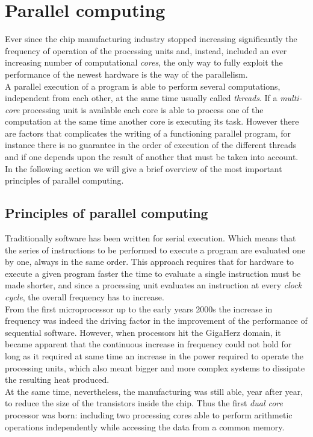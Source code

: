 \chapter{Parallel computing}\label{ch:gpu}
Ever since the chip manufacturing industry stopped increasing significantly the frequency of operation of the processing units and, instead, included an ever increasing number of computational \textit{cores}, the only way to fully exploit the performance of the newest hardware is the way of the parallelism.\\
A parallel execution of a program is able to perform several computations, independent from each other, at the same time usually called \textit{threads}. If a \textit{multi-core} processing unit is available each core is able to process one of the computation at the same time another core is executing its task. However there are factors that complicates the writing of a functioning parallel program, for instance there is no guarantee in the order of execution of the different threads and if one depends upon the result of another that must be taken into account.\\
In the following section we will give a brief overview of the most important principles of parallel computing.

\section{Principles of parallel computing}
Traditionally software has been written for serial execution. Which means that the series of instructions to be performed to execute a program are evaluated one by one, always in the same order. This approach requires that for hardware to execute a given program faster the time to evaluate a single instruction must be made shorter, and since a processing unit evaluates an instruction at every \textit{clock cycle}, the overall frequency has to increase.\\
From the first microprocessor up to the early years 2000s the increase in frequency was indeed the driving factor in the improvement of the performance of sequential software. However, when processors hit the GigaHerz domain, it became apparent that the continuous increase in frequency could not hold for long as it required at same time an increase in the power required to operate the processing units, which also meant bigger and more complex systems to dissipate the resulting heat produced.\\
At the same time, nevertheless, the manufacturing was still able, year after year, to reduce the size of the transistors inside the chip. Thus the first \textit{dual core} processor was born: including two processing cores able to perform arithmetic operations independently while accessing the data from a common memory.\\

